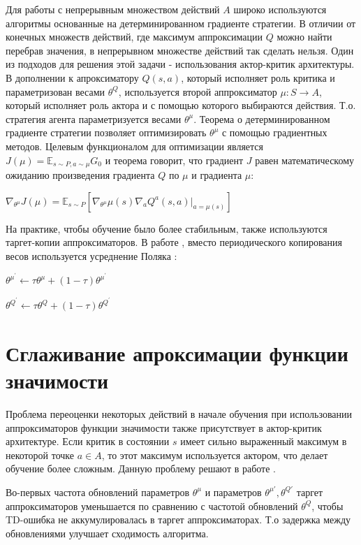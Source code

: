 \documentclass{mipt-thesis-bs}
\begin{document}
Для работы с непрерывным множеством действий $A$ широко используются алгоритмы основанные на детерминированном градиенте стратегии. В отличии от конечных множеств действий, где максимум аппроксимации $Q$ можно найти перебрав значения, в непрерывном множестве действий так сделать нельзя. Один из подходов для решения этой задачи - использования актор-критик архитектуры. В дополнении к апроксиматору $Q(s,a)$, который исполняет роль критика и параметризован весами $\theta^Q$, используется второй аппроксиматор $\mu:S\rightarrow A$, который исполняет роль актора и с помощью которого выбираются действия. Т.о. стратегия агента параметризуется весами $\theta^\mu$. Теорема о детерминированном градиенте стратегии позволяет оптимизировать $\theta^\mu$ с помощью градиентных методов. Целевым функционалом для оптимизации является $J(\mu)=\mathbb{E}_{s\sim P, a\sim\mu}G_0$ и теорема говорит, что градиент $J$ равен математическому ожиданию произведения градиента $Q$ по $\mu$ и градиента $\mu$:

\begin{center}
$\nabla_{\theta^\mu} J(\mu) =\mathbb{E}_{s \sim P}[\nabla_{\theta^\mu} \mu(s) \nabla_{a} Q^{a}(s, a)|_{a=\mu(s)}]$
\end{center}

На практике, чтобы обучение было более стабильным, также используются таргет-копии аппроксиматоров. В работе \cite{ddpg}, вместо периодического копирования весов используется усреднение Поляка \cite{polyak}:

\begin{center}
    $\theta^{\mu^{\prime}} \leftarrow \tau \theta^{\mu}+(1-\tau) \theta^{\mu^{\prime}}$
    
     $\theta^{Q^{\prime}} \leftarrow \tau \theta^{Q}+(1-\tau) \theta^{Q^{\prime}}$
\end{center}

\section{Сглаживание апроксимации функции значимости}

Проблема переоценки некоторых действий в начале обучения при использовании аппроксиматоров функции значимости также присутствует в актор-критик архитектуре. Если критик в состоянии $s$ имеет сильно выраженный максимум в некоторой точке $a\in A$, то этот максимум используется актором, что делает обучение более сложным. Данную проблему решают в работе \cite{td3}.

Во-первых частота обновлений параметров $\theta^\mu$ и параметров $\theta^{\mu'}, \theta^{Q'}$ таргет аппроксиматоров уменьшается по сравнению с частотой обновлений $\theta^Q$, чтобы TD-ошибка не аккумулировалась в таргет аппроксиматорах. Т.о задержка между обновлениями улучшает сходимость алгоритма.
\end{document}

